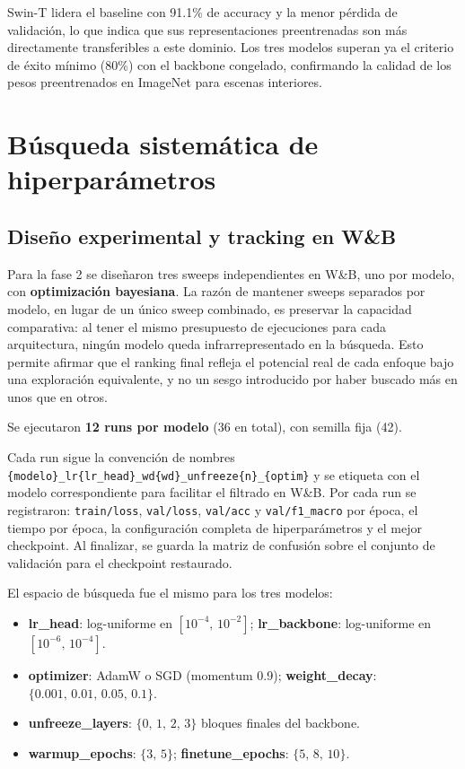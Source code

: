 \documentclass[11pt,a4paper]{article}
\begin{document}
Swin-T lidera el baseline con 91.1\% de accuracy y la menor pérdida de validación, lo que indica que sus representaciones preentrenadas son más directamente transferibles a este dominio. Los tres modelos superan ya el criterio de éxito mínimo (80\%) con el backbone congelado, confirmando la calidad de los pesos preentrenados en ImageNet para escenas interiores.

\section{Búsqueda sistemática de hiperparámetros}

\subsection{Diseño experimental y tracking en W\&B}

Para la fase 2 se diseñaron tres sweeps independientes en W\&B, uno por modelo, con \textbf{optimización bayesiana}.
La razón de mantener sweeps separados por modelo, en lugar de un único sweep combinado, es preservar la capacidad comparativa: al tener el mismo presupuesto de ejecuciones para cada arquitectura, ningún modelo queda infrarrepresentado en la búsqueda. Esto permite afirmar que el ranking final refleja el potencial real de cada enfoque bajo una exploración equivalente, y no un sesgo introducido por haber buscado más en unos que en otros.

Se ejecutaron \textbf{12 runs por modelo} (36 en total), con semilla fija (42).

Cada run sigue la convención de nombres \texttt{\{modelo\}\_lr\{lr\_head\}\_wd\{wd\}\_unfreeze\{n\}\_\{optim\}} y se etiqueta con el modelo correspondiente para facilitar el filtrado en W\&B. Por cada run se registraron: \texttt{train/loss}, \texttt{val/loss}, \texttt{val/acc} y \texttt{val/f1\_macro} por época, el tiempo por época, la configuración completa de hiperparámetros y el mejor checkpoint. Al finalizar, se guarda la matriz de confusión sobre el conjunto de validación para el checkpoint restaurado.

El espacio de búsqueda fue el mismo para los tres modelos:

\begin{itemize}\setlength\itemsep{2pt}
    \item \textbf{lr\_head}: log-uniforme en $[10^{-4},\,10^{-2}]$; \quad \textbf{lr\_backbone}: log-uniforme en $[10^{-6},\,10^{-4}]$.
    \item \textbf{optimizer}: AdamW o SGD (momentum 0.9); \quad \textbf{weight\_decay}: $\{0.001,\,0.01,\,0.05,\,0.1\}$.
    \item \textbf{unfreeze\_layers}: $\{0,\,1,\,2,\,3\}$ bloques finales del backbone.
    \item \textbf{warmup\_epochs}: $\{3,\,5\}$; \quad \textbf{finetune\_epochs}: $\{5,\,8,\,10\}$.
\end{itemize}
\end{document}
